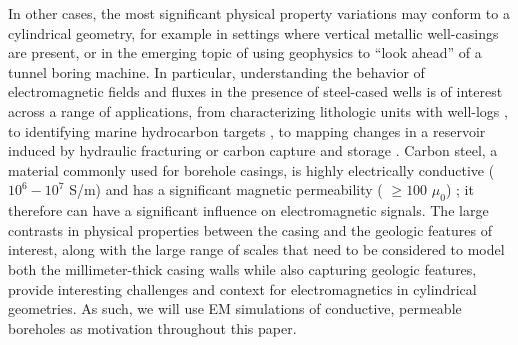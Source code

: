 In other cases, the most significant physical property variations may conform to a cylindrical geometry, for example in settings where vertical metallic well-casings are present, or in the emerging topic of using geophysics to ``look ahead'' of a tunnel boring machine. In particular, understanding the behavior of electromagnetic fields and fluxes in the presence of steel-cased wells is of interest across a range of applications, from characterizing lithologic units with well-logs \citep{Kaufman1990, Kaufman1993, Augustin1989}, to identifying marine hydrocarbon targets \citep{Kong2009, Swidinsky2013, Tietze2015}, to mapping changes in a reservoir induced by hydraulic fracturing or carbon capture and storage \citep{Pardo2013, Borner2015, Um2015, Weiss2016, hoversten2017borehole, Zhang2018}. Carbon steel, a material commonly used for borehole casings, is highly electrically conductive ($10^6 - 10^7$ S/m) and has a significant magnetic permeability ( $\geq 100$ $\mu_0$) \citep{wuhabashy1994}; it therefore can have a significant influence on electromagnetic signals. The large contrasts in physical properties between the casing and the geologic features of interest, along with the large range of scales that need to be considered to model both the millimeter-thick casing walls while also capturing geologic features, provide interesting challenges and context for electromagnetics in cylindrical geometries. As such, we will use EM simulations of conductive, permeable boreholes as motivation throughout this paper.

